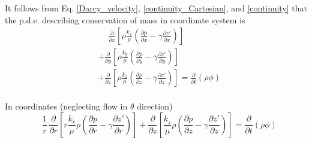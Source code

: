 \documentclass{llncs}
\numberwithin{equation}{section}
\numberwithin{figure}{section}
\numberwithin{table}{section}
\begin{document}
    It follows from Eq. \ref{Darcy_velocity}, \ref{continuity_Cartesian}, and \ref{continuity} that the p.d.e. describing conservation of mass in  coordinate system is
    \begin{equation}
        \begin{split}
            & \,\,\,\,\,\,\ \frac{\partial }{\partial x}\left[ \rho \frac{{{k}_{x}}}{\mu }\left( \frac{\partial p}{\partial x}-\gamma \frac{\partial z'}{\partial x} \right) \right] \\
            & +\frac{\partial }{\partial y}\left[ \rho \frac{{{k}_{y}}}{\mu }\left( \frac{\partial p}{\partial y}-\gamma \frac{\partial z'}{\partial y} \right) \right] \\
            & +\frac{\partial }{\partial z}\left[ \rho \frac{{{k}_{z}}}{\mu }\left( \frac{\partial p}{\partial z}-\gamma \frac{\partial z'}{\partial z} \right) \right]=\frac{\partial }{\partial t}\left( \rho \phi  \right) \\
        \end{split}
    \label{Continuity_Darcy}
    \end{equation}

    In  coordinates (neglecting flow in $\theta$ direction)
    \begin{equation}
        \,\,\,\,\,\frac{1}{r}\,\frac{\partial }{\partial r}\left[ r\frac{{{k}_{r}}}{\mu }\rho \left( \frac{\partial p}{\partial r}-\gamma \frac{\partial z'}{\partial r} \right) \right]+\frac{\partial }{\partial z}\left[ \frac{{{k}_{z}}}{\mu }\rho \left( \frac{\partial p}{\partial z}-\gamma \frac{\partial z'}{\partial z} \right) \right]=\frac{\partial }{\partial t}\left( \rho \phi  \right)
    \label{Continuity_Darcy_Cylindrical}
    \end{equation}
\end{document}
